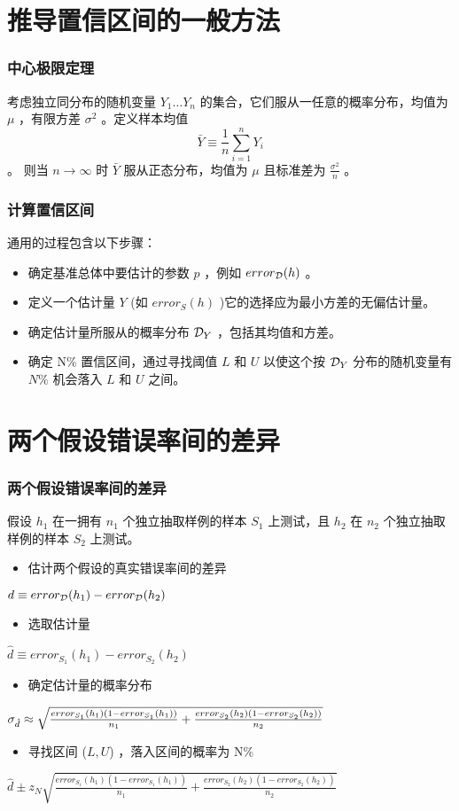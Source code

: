 \documentclass{beamer}
\begin{document}
\section{推导置信区间的一般方法}
\label{sec-4}
\begin{frame}
\frametitle{中心极限定理}
\label{sec-4-1}


考虑独立同分布的随机变量 $Y_{1} \ldots Y_{n}$ 的集合，它们服从一任意的概率分布，均值为 $\mu$ ，有限方差 $\sigma^{2}$ 。定义样本均值
\[\bar{Y}\equiv\frac{1}{n}\sum_{i=1}^{n}Y_{i} \]  。
则当 $n \rightarrow \infty$ 时
$\bar{Y}$ 服从正态分布，均值为 $\mu$ 且标准差为 $\frac{\sigma^{2}}{n}$ 。
\end{frame}
\begin{frame}
\frametitle{计算置信区间}
\label{sec-4-2}


通用的过程包含以下步骤：
\begin{itemize}
\item 确定基准总体中要估计的参数 $p$ ，例如 $error_{\cal D}(h)$ 。
\item 定义一个估计量 $Y$ (如 $error_S(h)$ )它的选择应为最小方差的无偏估计量。
\item 确定估计量所服从的概率分布 ${\cal D}_Y$ ，包括其均值和方差。
\item 确定 N\% 置信区间，通过寻找阈值 $L$ 和 $U$ 以使这个按 ${\cal D}_Y$ 分布的随机变量有 $N\%$ 机会落入 $L$ 和 $U$ 之间。
\end{itemize}
\end{frame}
\section{两个假设错误率间的差异}
\label{sec-5}
\begin{frame}
\frametitle{两个假设错误率间的差异}
\label{sec-5-1}

假设 $h_{1}$ 在一拥有 $n_1$ 个独立抽取样例的样本 $S_1$ 上测试，且 $h_2$ 在 $n_2$ 个独立抽取样例的样本 $S_2$ 上测试。

\begin{itemize}
\item 估计两个假设的真实错误率间的差异
\end{itemize}
$d \equiv error_{\cal{D}}(h_{1}) - error_{\cal{D}}(h_{2})$
\begin{itemize}
\item 选取估计量
\end{itemize}
$\hat{d} \equiv error_{S_{1}}(h_{1}) - error_{S_{2}}(h_{2})$

\begin{itemize}
\item 确定估计量的概率分布
\end{itemize}
$\small \sigma_{\hat{d}} \approx \sqrt{\frac{error_{S_{1}}(h_{1})(1 - error_{S_{1}}(h_{1}))}{n_{1}} + \frac{error_{S_{2}}(h_{2})(1 - error_{S_{2}}(h_{2}))}{n_{2}}}$
\begin{itemize}
\item 寻找区间 ($L, U$) ，落入区间的概率为 N\%
\end{itemize}
$\hat{d} \pm z_{N} \sqrt{\frac{error_{S_{1}}(h_{1})(1 -
error_{S_{1}}(h_{1}))}{n_{1}} + \frac{error_{S_{2}}(h_{2})(1 -
error_{S_{2}}(h_{2}))}{n_{2}} }$
\end{frame}
\end{document}
